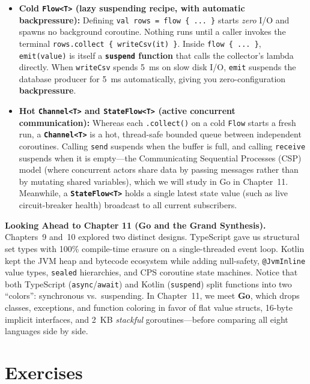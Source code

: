 \begin{itemize}
  \item \textbf{Cold \texttt{Flow<T>} (lazy suspending recipe, with automatic backpressure):} Defining \texttt{val rows = flow \{ ... \}} starts \emph{zero} I/O and spawns no background coroutine. Nothing runs until a caller invokes the terminal \texttt{rows.collect \{ writeCsv(it) \}}. Inside \texttt{flow \{ ... \}}, \texttt{emit(value)} is itself a \textbf{\texttt{suspend} function} that calls the collector's lambda directly. When \texttt{writeCsv} spends 5~ms on slow disk I/O, \texttt{emit} suspends the database producer for 5~ms automatically, giving you zero-configuration \textbf{backpressure}.
  \item \textbf{Hot \texttt{Channel<T>} and \texttt{StateFlow<T>} (active concurrent communication):} Whereas each \texttt{.collect()} on a cold \texttt{Flow} starts a fresh run, a \textbf{\texttt{Channel<T>}} is a hot, thread-safe bounded queue between independent coroutines. Calling \texttt{send} suspends when the buffer is full, and calling \texttt{receive} suspends when it is empty---the Communicating Sequential Processes (CSP) model (where concurrent actors share data by passing messages rather than by mutating shared variables), which we will study in Go in Chapter~11. Meanwhile, a \textbf{\texttt{StateFlow<T>}} holds a single latest state value (such as live circuit-breaker health) broadcast to all current subscribers.
\end{itemize}

\begin{connectionbox}
\textbf{Looking Ahead to Chapter 11 (Go and the Grand Synthesis).} Chapters~9 and~10 explored two distinct designs. TypeScript gave us structural set types with 100\% compile-time erasure on a single-threaded event loop. Kotlin kept the JVM heap and bytecode ecosystem while adding null-safety, \texttt{@JvmInline} value types, \texttt{sealed} hierarchies, and CPS coroutine state machines. Notice that both TypeScript (\texttt{async}/\texttt{await}) and Kotlin (\texttt{suspend}) split functions into two ``colors'': synchronous vs.\ suspending. In Chapter~11, we meet \textbf{Go}, which drops classes, exceptions, and function coloring in favor of flat value structs, 16-byte implicit interfaces, and 2~KB \emph{stackful} goroutines---before comparing all eight languages side by side.
\end{connectionbox}

\section{Exercises}
\label{ch10:exercises}

